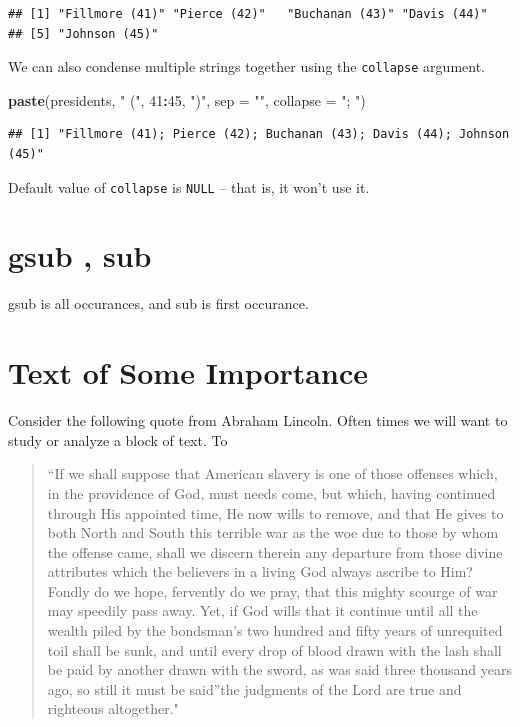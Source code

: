 \documentclass[
]{book}
\newenvironment{Shaded}{\begin{snugshade}}{\end{snugshade}}
\newcommand{\DataTypeTok}[1]{\textcolor[rgb]{0.13,0.29,0.53}{#1}}
\newcommand{\DecValTok}[1]{\textcolor[rgb]{0.00,0.00,0.81}{#1}}
\newcommand{\KeywordTok}[1]{\textcolor[rgb]{0.13,0.29,0.53}{\textbf{#1}}}
\newcommand{\NormalTok}[1]{#1}
\newcommand{\OperatorTok}[1]{\textcolor[rgb]{0.81,0.36,0.00}{\textbf{#1}}}
\newcommand{\StringTok}[1]{\textcolor[rgb]{0.31,0.60,0.02}{#1}}
\begin{document}
\begin{verbatim}
## [1] "Fillmore (41)" "Pierce (42)"   "Buchanan (43)" "Davis (44)"   
## [5] "Johnson (45)"
\end{verbatim}

We can also condense multiple strings together using the \texttt{collapse} argument.

\begin{Shaded}
\begin{Highlighting}[]
\KeywordTok{paste}\NormalTok{(presidents, }\StringTok{" ("}\NormalTok{,}
    \DecValTok{41}\OperatorTok{:}\DecValTok{45}\NormalTok{, }\StringTok{")"}\NormalTok{, }\DataTypeTok{sep =} \StringTok{""}\NormalTok{,}
    \DataTypeTok{collapse =} \StringTok{"; "}\NormalTok{)}
\end{Highlighting}
\end{Shaded}

\begin{verbatim}
## [1] "Fillmore (41); Pierce (42); Buchanan (43); Davis (44); Johnson (45)"
\end{verbatim}

Default value of \texttt{collapse} is \texttt{NULL} -- that is, it won't use it.

\hypertarget{gsub-sub}{%
\section{gsub , sub}\label{gsub-sub}}

gsub is all occurances, and sub is first occurance.

\hypertarget{text-of-some-importance}{%
\section{Text of Some Importance}\label{text-of-some-importance}}

Consider the following quote from Abraham Lincoln. Often times we will want to study or analyze a block of text. To

\begin{quote}
``If we shall suppose that American slavery is one of those
offenses which, in the providence of God, must needs come, but which, having
continued through His appointed time, He now wills to remove, and that He
gives to both North and South this terrible war as the woe due to those by
whom the offense came, shall we discern therein any departure from those
divine attributes which the believers in a living God always ascribe to Him?
Fondly do we hope, fervently do we pray, that this mighty scourge of war may
speedily pass away. Yet, if God wills that it continue until all the wealth
piled by the bondsman's two hundred and fifty years of unrequited toil shall
be sunk, and until every drop of blood drawn with the lash shall be paid by
another drawn with the sword, as was said three thousand years ago, so still
it must be said''the judgments of the Lord are true and righteous
altogether."
\end{quote}
\end{document}
